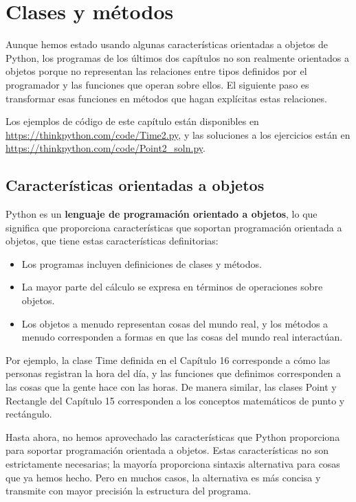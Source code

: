 \chapter{Clases y métodos}

Aunque hemos estado usando algunas características orientadas a objetos de Python, los programas de los últimos dos capítulos no son realmente orientados a objetos porque no representan las relaciones entre tipos definidos por el programador y las funciones que operan sobre ellos. El siguiente paso es transformar esas funciones en métodos que hagan explícitas estas relaciones.

Los ejemplos de código de este capítulo están disponibles en \url{https://thinkpython.com/code/Time2.py}, y las soluciones a los ejercicios están en \url{https://thinkpython.com/code/Point2_soln.py}.

\section{Características orientadas a objetos}

Python es un \textbf{lenguaje de programación orientado a objetos}, lo que significa que proporciona características que soportan programación orientada a objetos, que tiene estas características definitorias:

\begin{itemize}
\item Los programas incluyen definiciones de clases y métodos.
\item La mayor parte del cálculo se expresa en términos de operaciones sobre objetos.
\item Los objetos a menudo representan cosas del mundo real, y los métodos a menudo corresponden a formas en que las cosas del mundo real interactúan.
\end{itemize}

Por ejemplo, la clase Time definida en el Capítulo 16 corresponde a cómo las personas registran la hora del día, y las funciones que definimos corresponden a las cosas que la gente hace con las horas. De manera similar, las clases Point y Rectangle del Capítulo 15 corresponden a los conceptos matemáticos de punto y rectángulo.

Hasta ahora, no hemos aprovechado las características que Python proporciona para soportar programación orientada a objetos. Estas características no son estrictamente necesarias; la mayoría proporciona sintaxis alternativa para cosas que ya hemos hecho. Pero en muchos casos, la alternativa es más concisa y transmite con mayor precisión la estructura del programa.

